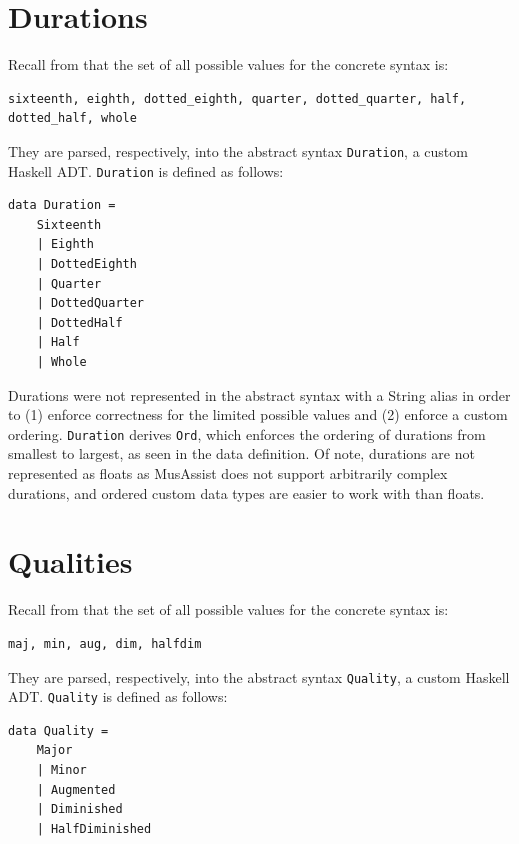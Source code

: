 \documentclass{report}
\newcommand\param[1]{\textttu{<#1>}}
\begin{document}
\section{Durations}
Recall from  that the set of all possible values for the concrete syntax \param{DURATION} is:

\begin{verbatim}
sixteenth, eighth, dotted_eighth, quarter, dotted_quarter, half, dotted_half, whole
\end{verbatim}

They are parsed, respectively, into the abstract syntax \verb.Duration., a custom Haskell ADT. \verb.Duration. is defined as follows:

\begin{verbatim}
data Duration = 
    Sixteenth
    | Eighth 
    | DottedEighth 
    | Quarter 
    | DottedQuarter 
    | DottedHalf 
    | Half 
    | Whole 
\end{verbatim}

Durations were not represented in the abstract syntax with a String alias in order to (1) enforce correctness for the limited possible values and (2) enforce a custom ordering. \verb.Duration. derives \verb.Ord., which enforces the ordering of durations from smallest to largest, as seen in the data definition. Of note, durations are not represented as floats as MusAssist does not support arbitrarily complex durations, and ordered custom data types are easier to work with than floats.

\section{Qualities}

Recall from   that the set of all possible values for the concrete syntax \param{QUALITY} is:
\begin{verbatim}
maj, min, aug, dim, halfdim
\end{verbatim}

They are parsed, respectively, into the abstract syntax \verb.Quality., a custom Haskell ADT. \verb.Quality. is defined as follows:

\begin{verbatim}
data Quality = 
    Major 
    | Minor
    | Augmented 
    | Diminished
    | HalfDiminished
\end{verbatim}
\end{document}

